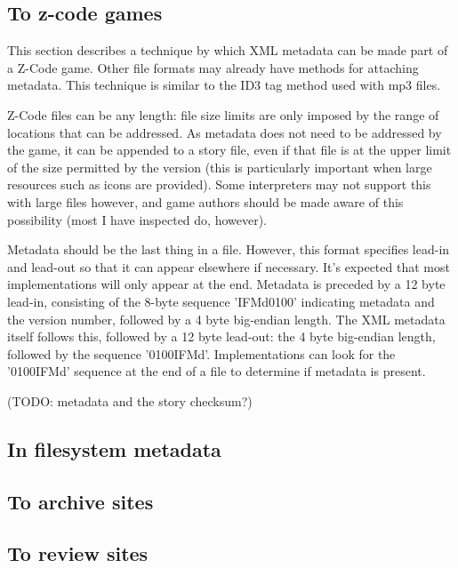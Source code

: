 \documentclass[a4paper,11pt]{article}
\begin{document}
\subsection{To z-code games}

This section describes a technique by which XML metadata can be made part of a Z-Code
game. Other file formats may already have methods for attaching metadata. This technique
is similar to the ID3 tag method used with mp3 files.

Z-Code files can be any length: file size limits are only imposed by the range of locations
that can be addressed. As metadata does not need to be addressed by the game, it can be
appended to a story file, even if that file is at the upper limit of the size permitted by the
version (this is particularly important when large resources such as icons are provided).
Some interpreters may not support this with large files however, and game authors should
be made aware of this possibility (most I have inspected do, however).

Metadata should be the last thing in a file. However, this format specifies lead-in and 
lead-out so that it can appear elsewhere if necessary. It's expected that most implementations
will only appear at the end. Metadata is preceded by a 12 byte lead-in, consisting of
the 8-byte sequence 'IFMd0100' indicating metadata and the version number, followed
by a 4 byte big-endian length. The XML metadata itself follows this, followed by a 12
byte lead-out: the 4 byte big-endian length, followed by the sequence '0100IFMd'.
Implementations can look for the '0100IFMd' sequence at the end of a file to determine
if metadata is present.

(TODO: metadata and the story checksum?)

\subsection{In filesystem metadata}

\subsection{To archive sites}

\subsection{To review sites}
\end{document}
